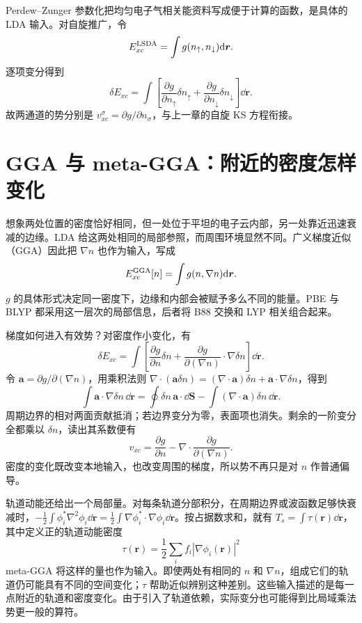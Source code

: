 Perdew--Zunger 参数化把均匀电子气相关能资料写成便于计算的函数，是具体的 LDA 输入。对自旋推广，令
\begin{equation}
E_{xc}^{\rm LSDA}=\int g(n_\uparrow,n_\downarrow)\mathrm{d}\bm r.
\end{equation}
逐项变分得到
\begin{equation}
\delta E_{xc}=\int\left[\frac{\partial g}{\partial n_\uparrow}\delta n_\uparrow
+\frac{\partial g}{\partial n_\downarrow}\delta n_\downarrow\right]\dd\bm r.
\end{equation}
故两通道的势分别是 $v_{xc}^\sigma=\partial g/\partial n_\sigma$，与上一章的自旋 KS 方程衔接。

\section{GGA 与 meta-GGA：附近的密度怎样变化}
想象两处位置的密度恰好相同，但一处位于平坦的电子云内部，另一处靠近迅速衰减的边缘。LDA 给这两处相同的局部参照，而周围环境显然不同。广义梯度近似（GGA）因此把 $\nabla n$ 也作为输入，写成
\begin{equation}
E_{xc}^{\rm GGA}[n]=\int g(n,\nabla n)\mathrm{d}\bm r.
\end{equation}
$g$ 的具体形式决定同一密度下，边缘和内部会被赋予多么不同的能量。PBE 与 BLYP 都采用这一层次的局部信息，后者将 B88 交换和 LYP 相关组合起来。

梯度如何进入有效势？对密度作小变化，有
\begin{equation}
\delta E_{xc}=\int\left[\frac{\partial g}{\partial n}\delta n+
\frac{\partial g}{\partial(\nabla n)}\cdot\nabla\delta n\right]\dd\bm r.
\end{equation}
令 $\bm a=\partial g/\partial(\nabla n)$，用乘积法则 $\nabla\cdot(\bm a\delta n)=(\nabla\cdot\bm a)\delta n+\bm a\cdot\nabla\delta n$，得到
\begin{equation}
\int\bm a\cdot\nabla\delta n\,\dd\bm r
=\oint\delta n\,\bm a\cdot\dd\bm S
-\int(\nabla\cdot\bm a)\delta n\,\dd\bm r.
\end{equation}
周期边界的相对两面贡献抵消；若边界变分为零，表面项也消失。剩余的一阶变分全都乘以 $\delta n$，读出其系数便有
\begin{equation}
v_{xc}=\frac{\partial g}{\partial n}-\nabla\cdot\frac{\partial g}{\partial(\nabla n)}.
\end{equation}
密度的变化既改变本地输入，也改变周围的梯度，所以势不再只是对 $n$ 作普通偏导。

轨道动能还给出一个局部量。对每条轨道分部积分，在周期边界或波函数足够快衰减时，$-\tfrac12\int\phi_i^*\nabla^2\phi_i\dd\bm r=\tfrac12\int\nabla\phi_i^*\cdot\nabla\phi_i\dd\bm r$。按占据数求和，就有 $T_s=\int\tau(\bm r)\dd\bm r$，其中定义正的轨道动能密度
\begin{equation}
\tau(\bm r)=\frac12\sum_i f_i|\nabla\phi_i(\bm r)|^2
\end{equation}
meta-GGA 将这样的量也作为输入。即使两处有相同的 $n$ 和 $\nabla n$，组成它们的轨道仍可能具有不同的空间变化；$\tau$ 帮助近似辨别这种差别。这些输入描述的是每一点附近的轨道和密度变化。由于引入了轨道依赖，实际变分也可能得到比局域乘法势更一般的算符。

